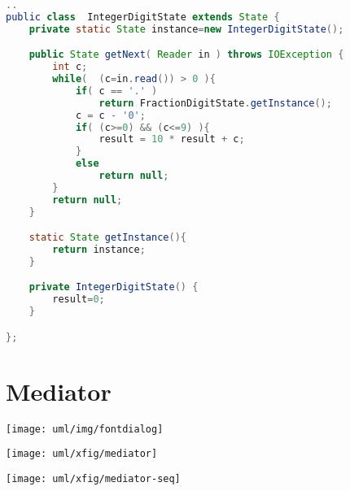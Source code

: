 \newpage
\begin{lstlisting}[language=java]
..
public class  IntegerDigitState extends State {
    private static State instance=new IntegerDigitState();

    public State getNext( Reader in ) throws IOException {
        int c;
        while(  (c=in.read()) > 0 ){
            if( c == '.' )
                return FractionDigitState.getInstance();
            c = c - '0';
            if( (c>=0) && (c<=9) ){
                result = 10 * result + c;
            }
            else
                return null;
        }
        return null;
    }

    static State getInstance(){
        return instance;
    }

    private IntegerDigitState() {
        result=0;
    }

};
\end{lstlisting}
%
\newpage
\section{Mediator}
\begin{center}
\texttt{[image: uml/img/fontdialog]}
\end{center}
\begin{center}
\texttt{[image: uml/xfig/mediator]}
\end{center}
\texttt{[image: uml/xfig/mediator-seq]}
\newpage
